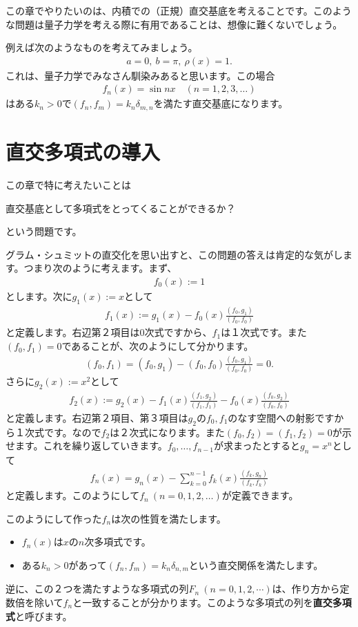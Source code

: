 \documentclass[report,paper=a4, fontsize=12pt, line_length=16cm, number_of_lines=33,dvipdfmx]{jlreq}
\newenvironment{myquote}{\begin{tcolorbox}[
  colback = blue!5, after = \noindent] }{\end{tcolorbox}}
\numberwithin{equation}{section}
\newcommand{\strong}[1]{\textsf{\bfseries #1}}
\begin{document}
この章でやりたいのは、内積での（正規）直交基底を考えることです。このような問題は量子力学を考える際に有用であることは、想像に難くないでしょう。

例えば次のようなものを考えてみましょう。
\begin{align}
  a=0,\ b=\pi,\ \rho(x)=1.
\end{align}
これは、量子力学でみなさん馴染みあると思います。この場合
\begin{align}
  f_{n}(x)=\sin nx\quad (n=1,2,3,\dots)
\end{align}
はある$k_n>0$で$(f_n,f_m)=k_n\delta_{m,n}$を満たす直交基底になります。

\section{直交多項式の導入}
この章で特に考えたいことは
\begin{myquote}
  直交基底として多項式をとってくることができるか？
\end{myquote}
という問題です。

グラム・シュミットの直交化を思い出すと、この問題の答えは肯定的な気がします。つまり次のように考えます。まず、
\begin{align}
  f_0(x):=1
\end{align}
とします。次に$g_1(x):=x$として
\begin{align}
  f_1(x):=g_1(x)-f_0(x)\frac{(f_0,g_1)}{(f_0,f_0)}
\end{align}
と定義します。右辺第２項目は$0$次式ですから、$f_1$は１次式です。また$(f_0,f_1)=0$であることが、次のようにして分かります。
\begin{align}
  (f_0,f_1)=(f_0,g_1)-(f_0,f_0)\frac{(f_0,g_1)}{(f_0,f_0)}=0.
\end{align}
さらに$g_2(x):=x^2$として
\begin{align}
  f_2(x):=g_2(x)-f_1(x)\frac{(f_1,g_2)}{(f_1,f_1)}-f_0(x)\frac{(f_0,g_2)}{(f_0,f_0)}
\end{align}
と定義します。右辺第２項目、第３項目は$g_2$の$f_0,f_1$のなす空間への射影ですから１次式です。なので$f_2$は２次式になります。また$(f_0,f_2)=(f_1,f_2)=0$が示せます。これを繰り返していきます。$f_0,\dots,f_{n-1}$が求まったとすると$g_{n}=x^{n}$として
\begin{align}
  f_{n}(x)=g_{n}(x)-\sum_{k=0}^{n-1}f_k(x)\frac{(f_k,g_n)}{(f_k,f_k)}
  \label{monicGram–Schmidt}
\end{align}
と定義します。このようにして$f_n\ (n=0,1,2,\dots)$が定義できます。

このようにして作った$f_n$は次の性質を満たします。
\begin{itemize}
  \item $f_n(x)$は$x$の$n$次多項式です。
  \item ある$k_n>0$があって$(f_n,f_m)=k_n\delta_{n,m}$という直交関係を満たします。
\end{itemize}
逆に、この２つを満たすような多項式の列$F_n\ (n=0,1,2,\cdots)$は、作り方から定数倍を除いて$f_n$と一致することが分かります。このような多項式の列を\strong{直交多項式}と呼びます。
\end{document}

